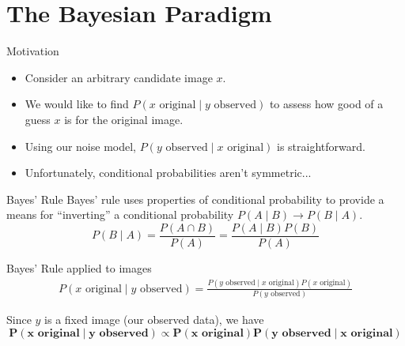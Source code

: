 \documentclass[10pt]{beamer}
\begin{document}
\section{The Bayesian Paradigm}

\begin{frame}{Motivation}
\begin{itemize}
\item Consider an arbitrary candidate image $x$.
\item We would like to find $P(x \text{ original} \mid y \text{ observed})$ to assess how good of a guess $x$ is for the original image.
\pause
\item Using our noise model, $P(y \text{ observed} \mid x \text{ original})$ is straightforward.
\item Unfortunately, conditional probabilities aren't symmetric...
\end{itemize}
\end{frame}

\begin{frame}{Bayes' Rule}
Bayes' rule uses properties of conditional probability to provide a means for ``inverting'' a conditional probability $P(A \mid B) \rightarrow P(B \mid A)$.
\[ P(B \mid A) = \frac{P(A \cap B)}{P(A)} = \frac{P(A \mid B)P(B)}{P(A)} \]
\end{frame}

\begin{frame}{Bayes' Rule applied to images}
\begin{align*} P(x \text{ original} \mid y \text{ observed}) = \frac{P(y \text{ observed} \mid x \text{ original} ) P(x \text{ original})}{P(y \text{ observed})}
\end{align*}

Since $y$ is a fixed image (our observed data), we have
\textbf{
\[ \boldsymbol{ P(x \text{ original} \mid y \text{ observed}) \propto P(x \text{ original}) P(y \text{ observed} \mid x \text{ original}) } \] }

\end{frame}
\end{document}
